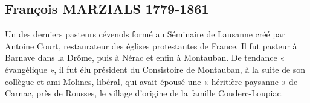 \subsection*{François MARZIALS 1779-1861}

Un des derniers pasteurs cévenols formé au Séminaire de Lausanne créé par Antoine
Court, restaurateur des églises protestantes de France. Il fut pasteur à Barnave dans
la Drôme, puis à Nérac et enfin à Montauban. De tendance « évangélique », il fut élu
président du Consistoire de Montauban, à la suite de son collègue et ami Molines,
libéral, qui avait épousé une « héritière-paysanne » de Carnac, près de Rousses, le
village d’origine de la famille Couderc-Loupiac.
